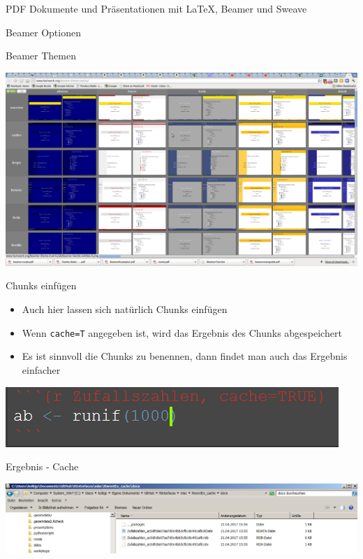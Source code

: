 \documentclass[ignorenonframetext,]{beamer}
\providecommand{\tightlist}{%
\setlength{\itemsep}{0pt}\setlength{\parskip}{0pt}}
\begin{document}
\begin{frame}[fragile]{PDF Dokumente und Präsentationen mit LaTeX,
Beamer und Sweave}
\begin{block}{Beamer Optionen}
\end{block}

\begin{block}{Beamer Themen}

\includegraphics{./tex2pdf.9796/205295da04c63e392ef666ca64d3c59930e4e603.png}

\end{block}

\begin{block}{Chunks einfügen}

\begin{itemize}
\tightlist
\item
  Auch hier lassen sich natürlich Chunks einfügen
\item
  Wenn \texttt{cache=T} angegeben ist, wird das Ergebnis des Chunks
  abgespeichert
\item
  Es ist sinnvoll die Chunks zu benennen, dann findet man auch das
  Ergebnis einfacher
\end{itemize}

\includegraphics{./tex2pdf.9796/3ccd44bfe08a5bc7c01d030ca7a9c2acfc99796d.png}

\end{block}

\begin{block}{Ergebnis - Cache}

\includegraphics{./tex2pdf.9796/236a6b84c9c2066a106676a0362f55c3f26b4998.png}


\end{block}
\end{frame}
\end{document}

